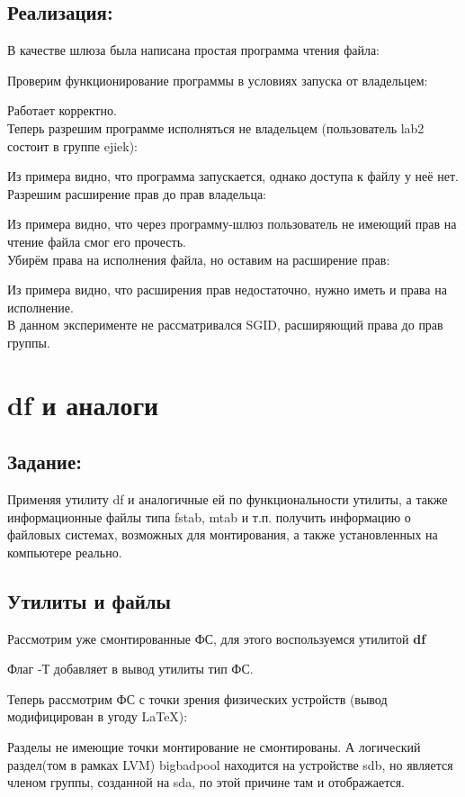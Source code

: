 \documentclass[a4paper]{article}
\begin{document}
\subsection{Реализация:}
В качестве шлюза была написана простая программа чтения файла:


Проверим функционирование программы в условиях запуска от владельцем:

Работает корректно.\\

Теперь разрешим программе исполняться не владельцем (пользователь lab2 состоит в группе ejiek):

Из примера видно, что программа запускается, однако доступа к файлу у неё нет.\\

Разрешим расширение прав до прав владельца:

Из примера видно, что через программу-шлюз пользователь не имеющий прав на чтение файла смог его прочесть.\\

Убирём права на исполнения файла, но оставим на расширение прав:

Из примера видно, что расширения прав недостаточно, нужно иметь и права на исполнение.\\

В данном эксперименте не рассматривался SGID, расширяющий права до прав группы.

\section{ df и аналоги} 
\subsection{Задание:} Применяя утилиту df и аналогичные ей по функциональности утилиты, а также информационные файлы типа fstab, mtab и т.п. получить информацию о файловых системах, возможных для монтирования, а также установленных на компьютере реально. 
\subsection{ Утилиты и файлы} Рассмотрим уже смонтированные ФС, для этого воспользуемся утилитой \textbf{df}

Флаг -Т добавляет в вывод утилиты тип ФС.

Теперь рассмотрим ФС с точки зрения физических устройств (вывод модифицирован в угоду LaTeX):

Разделы не имеющие точки монтирование не смонтированы. А логический раздел(том в рамках LVM) bigbadpool находится на устройстве sdb, но является членом группы, созданной на sda, по этой причине там и отображается.
\end{document}
